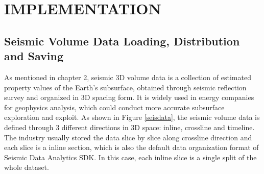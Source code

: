 %
%
%

\chapter{\uppercase{Implementation}}

\section{Seismic Volume Data Loading, Distribution and Saving}

As mentioned in chapter 2, seismic 3D volume data is a collection of estimated property values of the Earth's subsurface, obtained through seismic reflection survey and organized in 3D spacing form. It is widely used in energy companies for geophysics analysis, which could conduct more accurate subsurface exploration and exploit. As shown in Figure \ref{seisdata}, the seismic volume data is defined through 3 different directions in 3D space: inline, crossline and timeline. The industry usually stored the data slice by slice along crossline direction and each slice is a inline section, which is also the default data organization format of Seismic Data Analytics SDK. In this case, each inline slice is a single split of the whole dataset.

